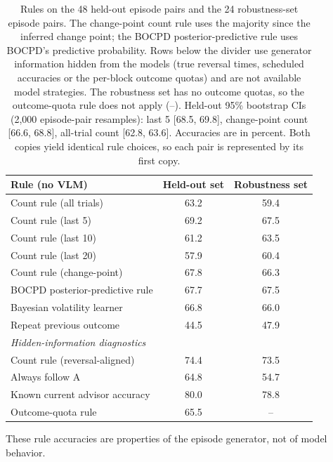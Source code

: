 \documentclass[letterpaper]{article} %
\begin{document}
\begin{table}[t]\centering\small
  \setlength{\tabcolsep}{4pt}
  \begin{tabular}{lcc}
    \toprule
    Rule (no VLM) & Held-out set & Robustness set \\
    \midrule
    Count rule (all trials) & 63.2 & 59.4 \\
    Count rule (last 5) & 69.2 & 67.5 \\
    Count rule (last 10) & 61.2 & 63.5 \\
    Count rule (last 20) & 57.9 & 60.4 \\
    Count rule (change-point) & 67.8 & 66.3 \\
    BOCPD posterior-predictive rule & 67.7 & 67.5 \\
    Bayesian volatility learner & 66.8 & 66.0 \\
    Repeat previous outcome & 44.5 & 47.9 \\
    \midrule
    \multicolumn{3}{l}{\textit{Hidden-information diagnostics}} \\
    Count rule (reversal-aligned) & 74.4 & 73.5 \\
    Always follow A & 64.8 & 54.7 \\
    Known current advisor accuracy & 80.0 & 78.8 \\
    Outcome-quota rule & 65.5 & -- \\
    \bottomrule
  \end{tabular}
  \caption{Rules on the 48 held-out episode pairs and the 24 robustness-set episode pairs. The change-point count rule uses the majority since the inferred change point; the BOCPD posterior-predictive rule uses BOCPD's predictive probability. Rows below the divider use generator information hidden from the models (true reversal times, scheduled accuracies or the per-block outcome quotas) and are not available model strategies. The robustness set has no outcome quotas, so the outcome-quota rule does not apply (--). Held-out 95\% bootstrap CIs (2{,}000 episode-pair resamples): last 5 [68.5, 69.8], change-point count [66.6, 68.8], all-trial count [62.8, 63.6]. Accuracies are in percent. Both copies yield identical rule choices, so each pair is represented by its first copy.}
  \label{tab:normsim}
\end{table}

These rule accuracies are properties of the episode generator, not of model behavior.
\end{document}
